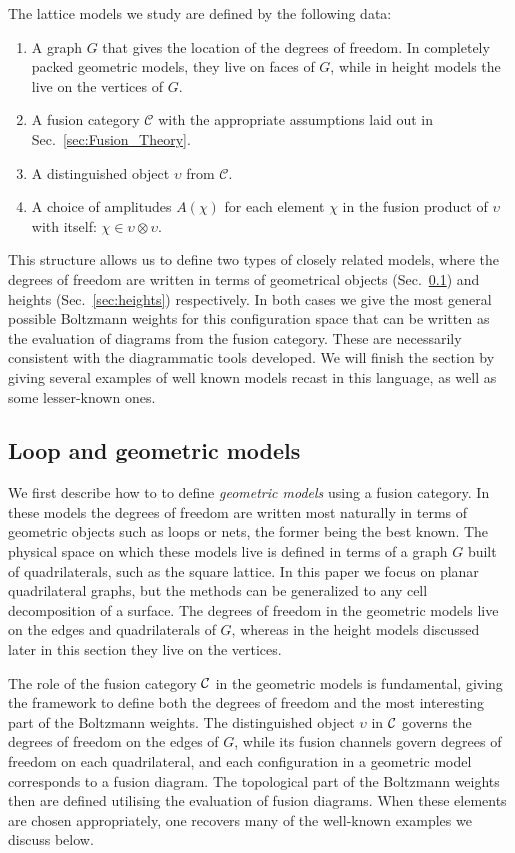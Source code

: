 The lattice models we study are defined by the following data:
\begin{enumerate}
\item A graph $G$ that gives the location of the degrees of freedom. In completely packed geometric models, they live on faces of $G$, while in height models the live on the vertices of $G$. 
\item	A fusion category $\mathcal{C}$ with the appropriate assumptions laid out in Sec.~\ref{sec:Fusion_Theory}.
\item	A distinguished object $\upsilon$ from $\mathcal{C}$.
\item	A choice of amplitudes $A(\chi)$ for each element $\chi$ in the fusion product of $\upsilon$ with itself: $\chi\in \upsilon \otimes \upsilon$.
\end{enumerate}
This structure allows us to define two types of closely related models, where the degrees of freedom are written in terms of geometrical objects (Sec.~\ref{sec:loopmodels}) and heights (Sec.~\ref{sec:heights}) respectively.
In both cases we give the most general possible Boltzmann weights for this configuration space that can be written as the evaluation of diagrams from the fusion category. These are necessarily consistent with the diagrammatic tools developed.
We will finish the section by giving several examples of well known models recast in this language, as well as some lesser-known ones.


\subsection{Loop and geometric models}
\label{sec:loopmodels}
We first describe how to to define {\em geometric models} using a fusion category. In these models the degrees of freedom are written most naturally in terms of geometric objects such as loops or nets, the former being the best known.
The physical space on which these models live is defined in terms of a graph $G$ built of quadrilaterals, such as the square lattice. In this paper we focus on planar quadrilateral graphs, but the methods can be generalized to any cell decomposition of a surface. The degrees of freedom in the geometric models live on the edges and quadrilaterals of $G$, whereas in the height models discussed later in this section they live on the vertices. 

The role of the fusion category ${\cal C}$ in the geometric models is fundamental, giving the framework to define both the degrees of freedom and the most interesting part of the Boltzmann weights. The distinguished object $\upsilon$ in ${\cal C}$ governs the degrees of freedom on the edges of $G$,
while its fusion channels govern degrees of freedom on each quadrilateral, and each configuration in a geometric model corresponds to a fusion diagram. The topological part of the Boltzmann weights then are defined utilising the evaluation of fusion diagrams. When these elements are chosen appropriately, one recovers many of the well-known examples we discuss below. 


